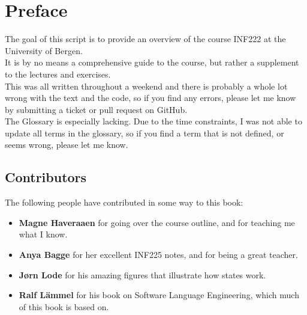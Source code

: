 \chapter*{Preface}
    The goal of this script is to provide an overview of the course INF222 at the University of Bergen.\\
    It is by no means a comprehensive guide to the course, but rather a supplement to the lectures and exercises.\\
    This was all written throughout a weekend and there is probably a whole lot wrong with the text and the code, so if you find any errors, please let me know by submitting a ticket or pull request on GitHub.\\
    The Glossary is especially lacking. Due to the time constraints, I was not able to update all terms in the glossary, so if you find a term that is not defined, or seems wrong, please let me know.\\
    
    \section*{Contributors}
    The following people have contributed in some way to this book:
    \begin{itemize}
        \item \textbf{Magne Haveraaen} for going over the course outline, and for teaching me what I know.
        \item \textbf{Anya Bagge} for her excellent INF225 notes, and for being a great teacher\cite{anya:2016}.
        \item \textbf{Jørn Lode} for his amazing figures that illustrate how states work.
        \item \textbf{Ralf Lämmel} for his book on Software Language Engineering, which much of this book is based on\cite{lammel:2018}.
    \end{itemize}

